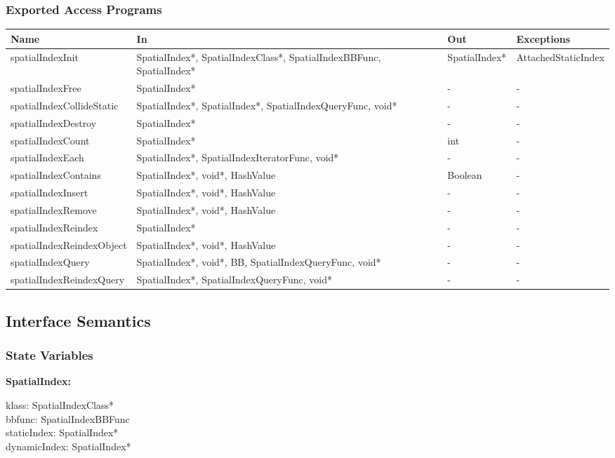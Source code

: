 \documentclass[12pt]{article}
\begin{document}
\subsubsection{Exported Access Programs} \label{SecEAPSpatial}
	\renewcommand*{\arraystretch}{1.2}
	\begin{longtable}{| y | x{3.5cm} | y | x{3.5cm} |}
	\hline \textbf{Name} & \textbf{In} & \textbf{Out} & \textbf{Exceptions} \\ \hline 
	spatialIndexInit & SpatialIndex*, SpatialIndexClass*, SpatialIndexBBFunc, SpatialIndex* & SpatialIndex* & AttachedStaticIndex \\ \hline
	spatialIndexFree & SpatialIndex* & - & - \\ \hline
	spatialIndexCollideStatic & SpatialIndex*, SpatialIndex*, SpatialIndexQueryFunc, void* & - & - \\ \hline
	spatialIndexDestroy & SpatialIndex* & - & - \\ \hline
	spatialIndexCount & SpatialIndex* & int & - \\ \hline
	spatialIndexEach & SpatialIndex*, SpatialIndexIteratorFunc, void* & - & - \\ \hline
	spatialIndexContains & SpatialIndex*, void*, HashValue & Boolean & - \\ \hline
	spatialIndexInsert & SpatialIndex*, void*, HashValue & - & - \\ \hline
	spatialIndexRemove & SpatialIndex*, void*, HashValue & - & - \\ \hline
	spatialIndexReindex & SpatialIndex* & - & - \\ \hline
	spatialIndexReindexObject & SpatialIndex*, void*, HashValue & - & - \\ \hline
	spatialIndexQuery & SpatialIndex*, void*, BB, SpatialIndexQueryFunc, void* & - & - \\ \hline
	spatialIndexReindexQuery & SpatialIndex*, SpatialIndexQueryFunc, void* & - & - \\ \hline
\end{longtable}

\subsection{Interface Semantics}

\subsubsection{State Variables} \label{SecSVSpatial}
\textbf{SpatialIndex:} 
\begin{multicols}{2}
	\noindent klass: SpatialIndexClass* \\
	bbfunc: SpatialIndexBBFunc \\
	staticIndex: SpatialIndex* \\
	dynamicIndex: SpatialIndex*
\end{multicols}
\end{document}
